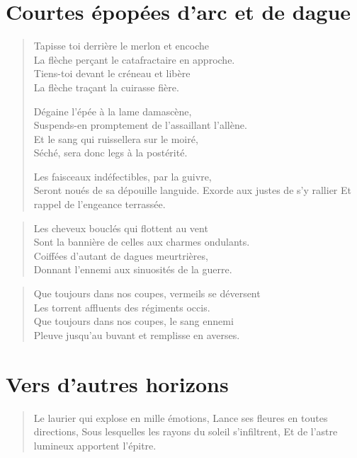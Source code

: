 \section*{Courtes épopées d’arc et de dague}
\begin{verse}
Tapisse toi derrière le merlon et encoche\\
La flèche perçant le catafractaire en approche.\\
Tiens-toi devant le créneau et libère\\
La flèche traçant la cuirasse fière.

Dégaine l’épée à la lame damascène,\\
Suspends-en promptement de l’assaillant l’allène.\\
Et le sang qui ruissellera sur le moiré,\\
Séché, sera donc legs à la postérité.

Les faisceaux indéfectibles, par la guivre,\\
Seront noués de sa dépouille languide.
Exorde aux justes de s’y rallier
Et rappel de l’engeance terrassée.
\end{verse}

\begin{verse}
Les cheveux bouclés qui flottent au vent\\
Sont la bannière de celles aux charmes ondulants.\\
Coiffées d’autant de dagues meurtrières,\\
Donnant l’ennemi aux sinuosités de la guerre.
\end{verse}

\begin{verse}
Que toujours dans nos coupes, vermeils se déversent\\
Les torrent affluents des  régiments occis.\\
Que toujours dans nos coupes, le sang ennemi\\
Pleuve jusqu’au buvant et remplisse en averses.
\end{verse}

\section*{Vers d’autres horizons}

\begin{verse}
Le laurier qui explose en mille émotions,
Lance ses fleures en toutes directions,
Sous lesquelles les rayons du soleil s’infiltrent,
Et de l’astre lumineux apportent l’épitre.
\end{verse}

